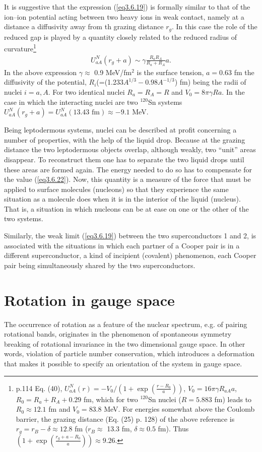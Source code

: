  
 It is suggestive that the expression (\ref{eq3.6.19}) is formally similar to that of the ion--ion potential acting between two heavy ions in weak contact, namely at a distance  a diffusivity away from th grazing distance $r_g$. In this case the role of the reduced gap is played by a quantity closely related to the reduced radius of curvature\footnote{\cite{Broglia:04a} p.114  Eq. (40), $U_{aA}^{N}(r)=-V_0/(1+\exp(\frac{r-R_0}{a}))$, $V_0=16\pi\gamma R_{aA}a$, $R_0=R_a+R_A+0.29$ fm, which for two $^{120}$Sn nuclei ($R=5.883$ fm) leads to $R_0\approx12.1$ fm and $V_0=83.8$ MeV. For energies somewhat above the Coulomb barrier, the grazing distance (Eq. (25) p. 128) of the above reference is $r_g=r_B-\delta\approx12.8$ fm ($r_B\approx$ 13.3 fm, $\delta\approx0.5$ fm). Thus $(1+\exp(\frac{r_g+a-R_0}{a}))\approx9.26$.}
 \begin{align}\label{eq3.6.22}
 U_{aA}^N(r_g+a)\sim \gamma\frac{R_aR_A}{R_a+R_A}a.
 \end{align}
 In the above expression $\gamma\approx$ 0.9 MeV/fm$^2$ is the surface tension, $a=0.63$ fm the diffusivity of the potential, $R_i$(=(1.233$A^{1/3}-0.98A^{-1/3}$) fm) being the radii of nuclei $i=a,A$. For two identical nuclei $R_a=R_A=R$ and $V_0=8\pi\gamma R a$. In the case in which the interacting nuclei are two  $^{120}$Sn systems  $U_{aA}^N(r_g+a)=U_{aA}^N(13.43 \text{ fm})\approx-9.1$ MeV.
 
 
 
   Being leptodermous systems, nuclei can be described at profit concerning a number of properties, with the help of the liquid drop. Because at the grazing distance the two leptodermous objects overlap, although weakly, two ``unit'' areas disappear. To reconstruct them one has to separate the two liquid drops until these areas are formed again. The energy needed to do so has to compensate for the value (\ref{eq3.6.22}).  Now, this quantity is a measure of the force that
  must be applied to surface molecules (nucleons) so that they experience the same situation as a molecule does when it is in the interior of the liquid (nucleus). That is, a situation in which nucleons can be at ease on one or the other of the two systems.
  
 
 Similarly, the weak limit (\ref{eq3.6.19}) between the two superconductors 1 and 2, is associated with the situations in which each partner of a Cooper pair is in a different superconductor, a kind of incipient (covalent) phenomenon, each Cooper pair being simultaneously shared by the two superconductors.  
\section{Rotation in gauge space}\label{S3.7}
The occurrence of rotation as a feature of the nuclear spectrum, e.g. of pairing rotational bands, originates in the phenomenon of spontaneous symmetry breaking of rotational invariance in the two dimensional gauge space. In other words, violation of particle number conservation, which introduces a deformation that makes it possible to specify an orientation of the system in gauge space.


